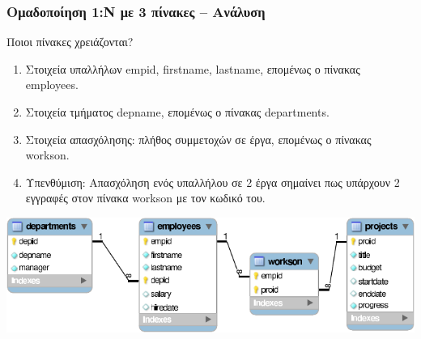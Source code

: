 \begin{frame}
\frametitle{Ομαδοποίηση 1:Ν με 3 πίνακες -- Ανάλυση}
  \vspace*{-1em}
  \begin{block}{\small Ποιοι πίνακες χρειάζονται?}
    \begin{enumerate} 
      \item Στοιχεία υπαλλήλων {\ra empid, firstname, lastname},
            επομένως ο πίνακας {\sq employees}.
      \item Στοιχεία τμήματος {\ra depname},
            επομένως ο πίνακας {\sq departments}.
      \item Στοιχεία απασχόλησης: πλήθος συμμετοχών σε έργα,
            επομένως ο πίνακας {\sq workson}.
      \item Υπενθύμιση: Απασχόληση ενός υπαλλήλου σε 2 έργα σημαίνει πως
            υπάρχουν 2 εγγραφές στον πίνακα {\sq workson} με τον κωδικό του.
    \end{enumerate}
  \end{block}
  \begin{minipage}{\wE}
    \vspace*{6pt}
    \includegraphics[scale=0.9]{../common/companyREL.pdf}
  \end{minipage}
\end{frame}



